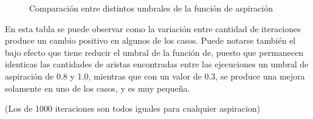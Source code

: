 
\begin{figure}[H]
    \centering
    \caption{Comparación entre distintos umbrales de la función de aspiración}
    \pgfplotstabletypeset[
        columns={0, greedy, lowiterationhighaspiration, highiterationlowaspiration, highiterationhighaspiration, highiterationfullaspiration}
    ]{\optimalsolutions}
\end{figure}

En esta tabla se puede observar como la variación entre cantidad de
iteraciones produce un cambio positivo en algunos de los casos. Puede notarse
también el bajo efecto que tiene reducir el umbral de la función de,
puesto que permanecen identicas las cantidades de aristas encontradas entre
las ejecuciones un umbral de aspiración de 0.8 y 1.0, mientras que con un
valor de 0.3, se produce una mejora solamente en uno de los casos, y es muy
pequeña.


(Los de 1000 iteraciones son todos iguales para cualquier aspiracion)